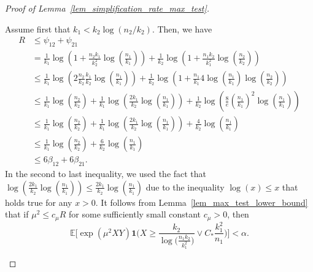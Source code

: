 \documentclass{article}
\newcommand{\EE}{\mathbb{E}}
\newcommand{\one}{\mathbf{1}}
\newcommand{\Ct}{C_{*}}
\begin{document}
\begin{proof}[Proof of Lemma~\ref{lem_simplification_rate_max_test}]
\begin{enumerate}
Assume first that  $k_1 < k_2\log(n_2/k_2)$. 
Then, we have 
\begin{align*}
    R &\leq \psi_{12} + \psi_{21}\\
    & = \frac{1}{k_1} \log\left(1+ \frac{n_2k_1}{k_2^2} \log\left(\frac{n_1}{k_1}\right)\right) + \frac{1}{k_2} \log\left(1+ \frac{n_1k_2}{k_1^2} \log\left(\frac{n_2}{k_2}\right)\right)\\
    & \leq \frac{1}{k_1} \log\left(2\frac{n_2}{k_2} \frac{k_1}{k_2} \log\left(\frac{n_1}{k_1}\right)\right) + \frac{1}{k_2} \log\left(1+ \frac{n_1}{k_1} 4\log\left(\frac{n_1}{k_1}\right)\log\left(\frac{n_2}{k_2}\right)\right)\\
    & \leq \frac{1}{k_1} \log\left(  \frac{n_2}{k_2} \right) + \frac{1}{k_1} \log\left(\frac{2k_1}{k_2} \log\left(\frac{n_1}{k_1}\right)\right) + \frac{1}{k_2} \log\left(\frac{8}{e} \left(\frac{n_1}{k_1} \right)^2\log\left(\frac{n_1}{k_1}\right)\right)\\
    & \leq \frac{1}{k_1} \log\left(  \frac{n_2}{k_2} \right) + \frac{1}{k_1} \log\left(\frac{2k_1}{k_2} \log\left(\frac{n_1}{k_1}\right)\right) + \frac{4}{k_2} \log\left(\frac{n_1}{k_1} \right)\\
    & \leq \frac{1}{k_1} \log\left(  \frac{n_2}{k_2} \right) + \frac{6}{k_2} \log\left(\frac{n_1}{k_1} \right)
    \\ &\leq 6 \beta_{12} + 6 \beta_{21}.
\end{align*}
In the second to last inequality, we used the fact that $\log\left(\frac{2k_1}{k_2} \log\left(\frac{n_1}{k_1}\right)\right) \leq \frac{2k_1}{k_2} \log\left(\frac{n_1}{k_1} \right)$ due to the inequality $\log(x) \leq x$ that holds true for any $x>0$. 
It follows from  Lemma~\ref{lem_max_test_lower_bound} that if $\mu^2 \leq c_\mu R$ for some sufficiently small constant $c_\mu>0$, then  
    $$\EE\Big[\exp(\mu^2XY)\one\Big(X \geq \frac{k_2}{\log\big(\frac{n_1k_2}{k_1^2}\big)}\lor  \Ct \frac{k_1^2}{n_1}\Big)\Big] < \alpha.$$ 

    


\end{enumerate}
\end{proof}
\end{document}
